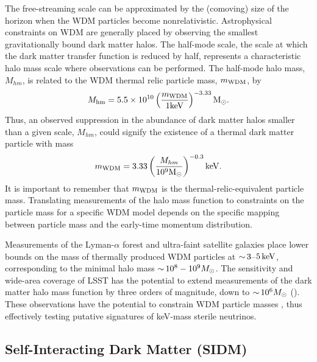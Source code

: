 The free-streaming scale can be approximated by the (comoving) size of the horizon when the WDM particles become nonrelativistic. 
Astrophysical constraints on WDM are generally placed by observing the smallest gravitationally bound dark matter halos.  
The half-mode scale, the scale at which the dark matter transfer function is reduced by half, represents a characteristic halo mass scale where observations can be performed. 
The half-mode halo mass, $M_{hm}$, is related to the WDM thermal relic particle mass, $m_{\rm WDM}$, by \citep[\eg][]{schneider2012,Bullock:2017xww}
\begin{equation} \label{eqn:Mhm}
    M_{\rm hm} = 5.5 \times 10^{10} \left( \frac{m_{\rm WDM}}{1 {\rm keV}} \right)^{-3.33} {\rm M_\odot}.
\end{equation}
Thus, an observed suppression in the abundance of dark matter halos smaller than a given scale, $M_{hm}$, could signify the existence of a thermal dark matter particle with mass
\begin{equation}
    m_{\rm WDM} =  3.33 \left(\frac{M_{hm}}{10^{9} {\rm M_\odot}} \right)^{-0.3} {\rm keV}.
\end{equation}
It is important to remember that $m_{\rm WDM}$ is the thermal-relic-equivalent particle mass. Translating measurements of the halo mass function to constraints on the particle mass for a specific WDM model depends on the specific mapping between particle mass and the early-time momentum distribution.

Measurements of the Lyman-$\alpha$ forest \citep[\eg][]{Viel:2013,2017PhRvD..96b3522I} and ultra-faint satellite galaxies \citep[\eg][]{Jethwa:2018,Kim:2017iwr,Nadler:2018}  place lower bounds on the mass of thermally produced WDM particles at $ {\sim}\, 3$--$5\mathrm{\,keV}$, corresponding to the minimal halo mass $ {\sim}\, 10^8-10^9 M_\odot$.
The sensitivity and wide-area coverage of LSST has the potential to extend measurements of the dark matter halo mass function by three orders of magnitude, down to $ {\sim}\, 10^6 M_\odot$ (). 
These observations have the potential to constrain WDM particle masses , thus effectively testing putative signatures of keV-mass sterile neutrinos.


\subsection{Self-Interacting Dark Matter (SIDM)}
\label{sec:sidm}

